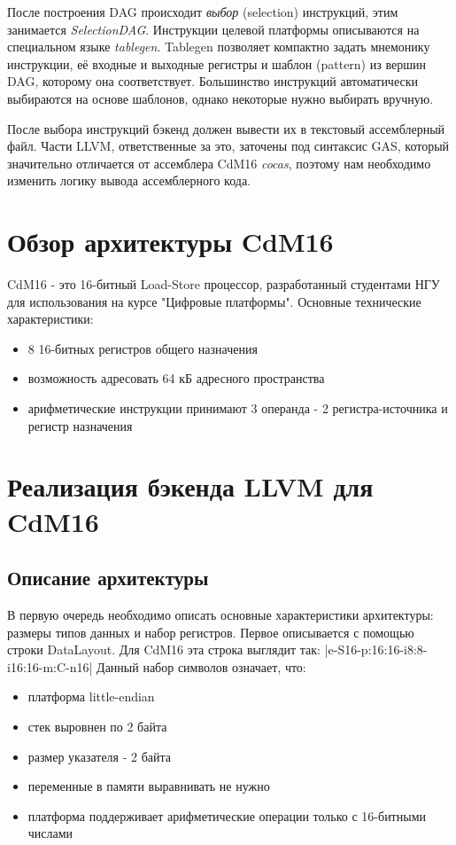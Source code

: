 \documentclass[a4paper,14pt]{extarticle}
\begin{document}
После построения DAG происходит \emph{выбор} (selection) инструкций, этим занимается \emph{SelectionDAG}. Инструкции целевой платформы описываются на специальном языке \emph{tablegen}. Tablegen позволяет компактно задать мнемонику инструкции, её входные и выходные регистры и шаблон (pattern) из вершин DAG, которому она соответствует. Большинство инструкций автоматически выбираются на основе шаблонов, однако некоторые нужно выбирать вручную.

После выбора инструкций бэкенд должен вывести их в текстовый ассемблерный файл. Части LLVM, ответственные за это, заточены под синтаксис GAS, который значительно отличается от ассемблера CdM16 \emph{cocas}, поэтому нам необходимо изменить логику вывода ассемблерного кода.


\pagebreak
\section{Обзор архитектуры CdM16}

CdM16 - это 16-битный Load-Store процессор, разработанный студентами НГУ для использования на курсе "Цифровые платформы". Основные технические характеристики:
\begin{itemize}
	\item 8 16-битных регистров общего назначения
	\item возможность адресовать 64 кБ адресного пространства
	\item арифметические инструкции принимают 3 операнда - 2 регистра-источника и регистр назначения
\end{itemize}

\pagebreak
\section{Реализация бэкенда LLVM для CdM16}
\subsection{Описание архитектуры}
В первую очередь необходимо описать основные характеристики архитектуры: размеры типов данных и набор регистров. Первое описывается с помощью строки DataLayout. Для CdM16 эта строка выглядит так: |e-S16-p:16:16-i8:8-i16:16-m:C-n16| %
Данный набор символов означает, что:
\begin{itemize}
	\item платформа little-endian
	\item стек выровнен по 2 байта
	\item размер указателя - 2 байта
	\item переменные в памяти выравнивать не нужно
	\item платформа поддерживает арифметические операции только с 16-битными числами
\end{itemize}
\end{document}
